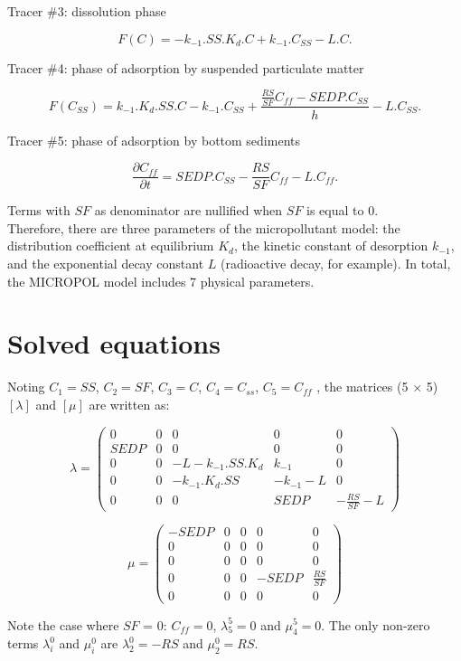 Tracer $\#$3: dissolution phase

\begin{equation}
  F(C) = -k_{-1}.SS.K_d.C + k_{-1}.C_{SS} - L.C.
\end{equation}

Tracer $\#$4: phase of adsorption by suspended particulate matter

\begin{equation}
  F(C_{SS}) = k_{-1}.K_d.SS.C - k_{-1}.C_{SS} + \frac{\frac{RS}{SF}C_{ff}-SEDP.C_{SS}}{h}- L.C_{SS}.
\end{equation}

Tracer $\#$5: phase of adsorption by bottom sediments

\begin{equation}
  \frac{\partial C_{ff}}{\partial t} = SEDP.C_{SS} - \frac{RS}{SF} C_{ff} - L.C_{ff}.
\end{equation}

Terms with $SF$ as denominator are nullified when $SF$ is equal to 0.\\

Therefore, there are three parameters of the micropollutant model:
the distribution coefficient at equilibrium $K_d$,
the kinetic constant of desorption $k_{-1}$,
and the exponential decay constant $L$ (radioactive decay, for example).
In total, the MICROPOL model includes 7 physical parameters.

\section{Solved equations}

Noting $C_1 = SS$, $C_2 = SF$, $C_3 =C$, $C_4 = C_{ss}$, $C_5 = C_{ff}$ ,
the matrices (5 $\times$ 5) $[\lambda]$ and $[\mu]$
are written as:

$$  \lambda = 
  \begin{pmatrix}
    0 & 0 & 0 & 0 & 0\\
    SEDP & 0 & 0 & 0 & 0\\
    0 & 0 & -L -k_{-1}.SS.K_d & k_{-1} & 0\\
    0 & 0 & -k_{-1}.K_d.SS & -k_{-1} - L & 0\\
    0 & 0 & 0 & SEDP & -\frac{RS}{SF}-L
  \end{pmatrix}
$$  

$$  \mu = 
  \begin{pmatrix}
    -SEDP & 0 & 0 & 0 & 0\\
    0 & 0 & 0 & 0 & 0\\
    0 & 0 & 0 & 0 & 0\\
    0 & 0 & 0 & -SEDP & \frac{RS}{SF}\\
    0 & 0 & 0 & 0 & 0
  \end{pmatrix}
$$  

Note the case where $SF$ = 0: $C_{ff} = 0$, $\lambda_5^5 = 0$ and $\mu_4^5 = 0$.
The only non-zero terms $\lambda_i^0$ and $\mu_i^0$ are $\lambda_2^0 = -RS$ and $\mu_2^0 = RS$.
